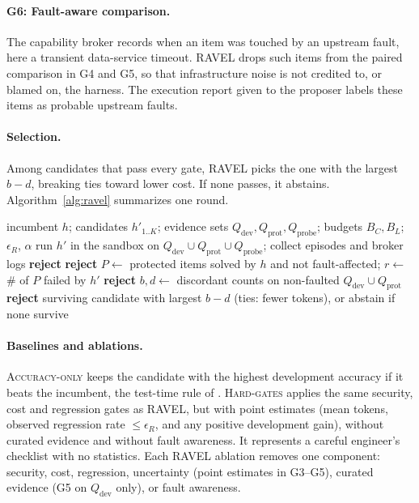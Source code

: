 \paragraph{G6: Fault-aware comparison.}
The capability broker records when an item was touched by an upstream fault, here a transient data-service
timeout. RAVEL drops such items from the paired comparison in G4 and G5, so that infrastructure noise is
not credited to, or blamed on, the harness. The execution report given to the proposer labels these items
as probable upstream faults.

\paragraph{Selection.}
Among candidates that pass every gate, RAVEL picks the one with the largest $b-d$, breaking ties toward
lower cost. If none passes, it abstains. Algorithm~\ref{alg:ravel} summarizes one round.

\begin{algorithm}[t]
\caption{One RAVEL acceptance round}
\label{alg:ravel}
\begin{algorithmic}[1]
\Require incumbent $h$; candidates $h'_{1..K}$; evidence sets $Q_{\text{dev}}, Q_{\text{prot}}, Q_{\text{probe}}$; budgets $B_C, B_L$; $\epsilon_R$, $\alpha$
  \State run $h'$ in the sandbox on $Q_{\text{dev}}\cup Q_{\text{prot}}\cup Q_{\text{probe}}$; collect episodes and broker logs
   \textbf{reject} \EndIf
   \textbf{reject} \EndIf
  \State $P \gets$ protected items solved by $h$ and not fault-affected; $r \gets$ \# of $P$ failed by $h'$
   \textbf{reject} \EndIf
  \State $b, d \gets$ discordant counts on non-faulted $Q_{\text{dev}}\cup Q_{\text{prot}}$
   \textbf{reject} \EndIf
\EndFor
\State \Return surviving candidate with largest $b-d$ (ties: fewer tokens), or abstain if none survive
\end{algorithmic}
\end{algorithm}

\paragraph{Baselines and ablations.}
\textsc{Accuracy-only} keeps the candidate with the highest development accuracy if it beats the
incumbent, the test-time rule of \citet{zhang2026harnesslearning}. \textsc{Hard-gates} applies the same
security, cost and regression gates as RAVEL, but with point estimates (mean tokens, observed regression
rate $\le \epsilon_R$, and any positive development gain), without curated evidence and without fault
awareness. It represents a careful engineer's checklist with no statistics. Each RAVEL ablation removes
one component: security, cost, regression, uncertainty (point estimates in G3--G5), curated evidence
(G5 on $Q_{\text{dev}}$ only), or fault awareness.

